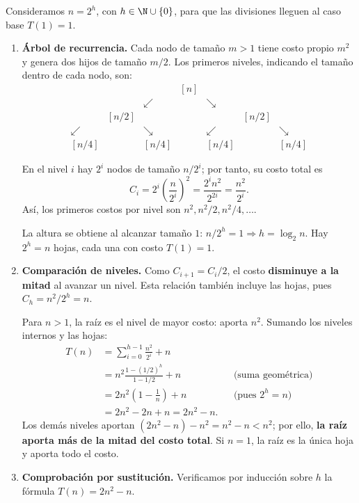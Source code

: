 
Consideramos $n=2^h$, con $h\in\N\cup\{0\}$, para que las divisiones lleguen al caso base $T(1)=1$.

\begin{enumerate}
\item \textbf{Árbol de recurrencia.} Cada nodo de tamaño $m>1$ tiene costo propio $m^2$ y genera dos hijos de tamaño $m/2$. Los primeros niveles, indicando el tamaño dentro de cada nodo, son:
\[
\begin{array}{ccccccc}
&&&[n]&&&\\
&&\swarrow&&\searrow&&\\
&[n/2]&&&&[n/2]&\\
\swarrow&&\searrow&&\swarrow&&\searrow\\
{}[n/4]&&[n/4]&&[n/4]&&[n/4]
\end{array}
\]

En el nivel $i$ hay $2^i$ nodos de tamaño $n/2^i$; por tanto, su costo total es
\[
C_i=2^i\left(\frac{n}{2^i}\right)^2
=\frac{2^in^2}{2^{2i}}
=\frac{n^2}{2^i}.
\]
Así, los primeros costos por nivel son $n^2,n^2/2,n^2/4,\ldots$.

La altura se obtiene al alcanzar tamaño $1$: $n/2^h=1\Rightarrow h=\log_2 n$. Hay $2^h=n$ hojas, cada una con costo $T(1)=1$.

\item \textbf{Comparación de niveles.} Como $C_{i+1}=C_i/2$, el costo \textbf{disminuye a la mitad} al avanzar un nivel. Esta relación también incluye las hojas, pues $C_h=n^2/2^h=n$.

Para $n>1$, la raíz es el nivel de mayor costo: aporta $n^2$. Sumando los niveles internos y las hojas:
\[
\begin{aligned}
T(n)
&=\sum_{i=0}^{h-1}\frac{n^2}{2^i}+n\\
&=n^2\frac{1-(1/2)^h}{1-1/2}+n
&&\text{(suma geométrica)}\\
&=2n^2\left(1-\frac1n\right)+n
&&\text{(pues $2^h=n$)}\\
&=2n^2-2n+n=2n^2-n.
\end{aligned}
\]
Los demás niveles aportan $(2n^2-n)-n^2=n^2-n<n^2$; por ello, \textbf{la raíz aporta más de la mitad del costo total}. Si $n=1$, la raíz es la única hoja y aporta todo el costo.

\item \textbf{Comprobación por sustitución.} Verificamos por inducción sobre $h$ la fórmula $T(n)=2n^2-n$.


\end{enumerate}
